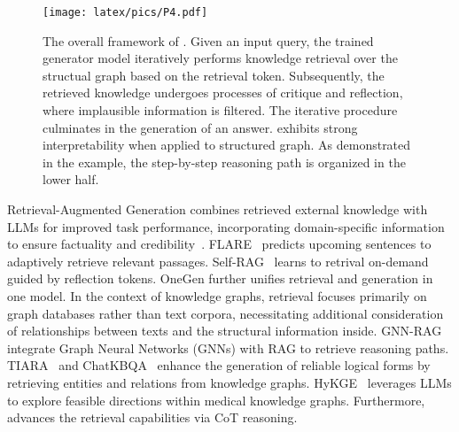 \begin{figure*}[t]
    \centering
    \texttt{[image: latex/pics/P4.pdf]}
    \caption{The overall framework of \model. Given an input query, the trained generator model \mgen iteratively performs knowledge retrieval over the structual graph based on the retrieval token. Subsequently, the retrieved knowledge undergoes processes of critique and reflection, where implausible information is filtered. The iterative procedure culminates in the generation of an answer. \model exhibits strong interpretability when applied to structured graph. As demonstrated in the example, the step-by-step reasoning path is organized in the lower half.}
    \label{fig:Self-graph}
\end{figure*}
 Retrieval-Augmented Generation combines retrieved external knowledge with LLMs for improved task performance, incorporating domain-specific information to ensure factuality and credibility~\cite{guu2020retrieval}.
FLARE~\cite{jiang-etal-2023-active} predicts upcoming sentences to adaptively retrieve relevant passages. Self-RAG~\cite{asai2023selfrag} learns to retrival on-demand guided by reflection tokens. OneGen further unifies retrieval and generation in one model. In the context of knowledge graphs, retrieval focuses primarily on graph databases rather than text corpora, necessitating additional consideration of relationships between texts and the structural information inside. GNN-RAG~\cite{mavromatis2024gnn} integrate Graph Neural Networks (GNNs) with RAG to retrieve reasoning paths. TIARA~\cite{shu-etal-2022-tiara} and ChatKBQA~\cite{luo-etal-2024-chatkbqa} enhance the generation of reliable logical forms by retrieving entities and relations from knowledge graphs. HyKGE~\cite{jiang2024hykge} leverages LLMs to explore feasible directions within medical knowledge graphs. Furthermore, \citet{ji-etal-2024-retrieval} advances the retrieval capabilities via CoT reasoning.

